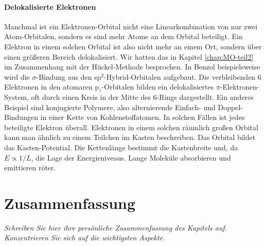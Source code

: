 \paragraph{Delokalisierte Elektronen} Manchmal ist ein Elektronen-Orbital nicht eine Linearkombination von nur zwei Atom-Orbitalen, sondern es sind mehr Atome an dem Orbital beteiligt. Ein Elektron in einem solchen Orbital ist also nicht mehr an einem Ort, sondern über einen größeren Bereich delokalisiert. Wir hatten das in Kapitel  \ref{chap:MO-teil2} im Zusammenhang mit der Hückel-Methode besprochen. In Benzol beispielsweise wird die $\sigma$-Bindung aus den sp$^2$-Hybrid-Orbitalen aufgebaut. Die verbleibenden 6 Elektronen in den atomaren p$_z$-Orbitalen bilden ein delokalisiertes $\pi$-Elektronen-System, oft durch einen Kreis in der Mitte des 6-Rings dargestellt. Ein anderes Beispiel sind konjugierte Polymere, also alternierende Einfach- und Doppel-Bindungen in einer Kette von Kohlenstoffatomen. In solchen Fällen ist jedes beteiligte Elektron überall. Elektronen in einem solchen räumlich großen Orbital kann man ähnlich zu einem Teilchen im Kasten beschreiben. Das Orbital bildet das Kasten-Potential. Die Kettenlänge bestimmt die Kastenbreite und, da $E \propto 1 /L$, die Lage der Energieniveaus. Lange Moleküle absorbieren und emittieren röter.



\section{Zusammenfassung}

\textit{Schreiben Sie hier ihre persönliche Zusammenfassung des Kapitels auf. Konzentrieren Sie sich auf die wichtigsten Aspekte.}

\vspace*{10cm}


\printbibliography[segment=\therefsegment,heading=subbibliography]
